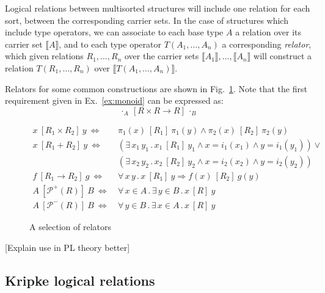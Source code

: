 \documentclass[sigplan,10pt,review,anonymous]{acmart}
\newcommand{\ifr}[1]{\ [{#1}]\ }
\begin{document}
Logical relations between multisorted structures
will include one relation for each sort,
between the corresponding carrier sets.
In the case of structures which include type operators,
we can associate to each base type $A$
a relation over its carrier set $\llbracket A \rrbracket$,
and to each type operator $T(A_1, \ldots, A_n)$
a corresponding \emph{relator},
which given relations $R_1, \ldots, R_n$ over
the carrier sets $\llbracket A_1 \rrbracket, \ldots, \llbracket A_n \rrbracket$
will construct a relation $T(R_1, \ldots, R_n)$
over $\llbracket T(A_1, \ldots, A_n) \rrbracket$.

Relators for some common constructions are shown in Fig.~\ref{fig:relators}.
Note that the first requirement given in Ex.~\ref{ex:monoid}
can be expressed as:
\[
  \cdot_A \ifr{R \times R \rightarrow R} \cdot_B
\]

\begin{figure}
  \begin{align*}
    x \ifr{R_1 \times R_2} y \ \Leftrightarrow\  &
      \pi_1(x) \ifr{R_1} \pi_1(y) \wedge
      \pi_2(x) \ifr{R_2} \pi_2(y) \\
    x \ifr{R_1 + R_2} y \ \Leftrightarrow\  &
      (\exists \, x_1 \, y_1 \,.\,
        x_1 \ifr{R_1} y_1 \wedge
        x = i_1(x_1) \wedge
        y = i_1(y_1)) \vee \\ &
      (\exists \, x_2 \, y_2 \,.\,
        x_2 \ifr{R_2} y_2 \wedge
        x = i_2(x_2) \wedge
        y = i_2(y_2)) \\
    f \ifr{R_1 \rightarrow R_2} g \ \Leftrightarrow\  &
      \forall \, x \, y \,.\,
        x \ifr{R_1} y \Rightarrow
        f(x) \ifr{R_2} g(y) \\
    A \ifr{\mathcal{P}^+(R)} B \ \Leftrightarrow\  &
      \forall \, x \in A \,.\,
      \exists \, y \in B \,.\,
      x \ifr{R} y \\
    A \ifr{\mathcal{P}^-(R)} B \ \Leftrightarrow\  &
      \forall \, y \in B \,.\,
      \exists \, x \in A \,.\,
      x \ifr{R} y
  \end{align*}
  \caption{A selection of relators}
  \label{fig:relators}
\end{figure}

[Explain use in PL theory better]


\subsection{Kripke logical relations} %
\end{document}
